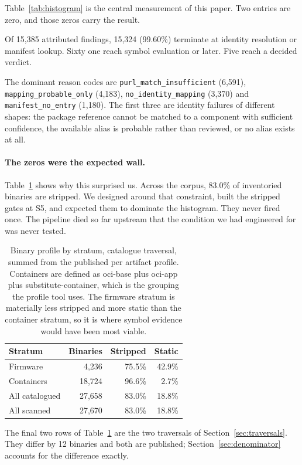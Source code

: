 Table~\ref{tab:histogram} is the central measurement of this paper. Two entries
are zero, and those zeros carry the result.

Of 15,385 attributed findings, 15,324 (99.60\%) terminate at identity resolution
or manifest lookup. Sixty one reach symbol evaluation or later. Five reach a
decided verdict.

The dominant reason codes are \texttt{purl\_\-match\_\-insufficient} (6,591),
\texttt{mapping\_probable\_only} (4,183), \texttt{no\_identity\_mapping} (3,370)
and \texttt{manifest\_no\_entry} (1,180). The first three are identity failures
of different shapes: the package reference cannot be matched to a component with
sufficient confidence, the available alias is probable rather than reviewed, or
no alias exists at all.

\paragraph{The zeros were the expected wall.} Table~\ref{tab:profile} shows why
this surprised us. Across the corpus, 83.0\% of inventoried binaries are
stripped. We designed around that constraint, built the stripped gates at S5, and
expected them to dominate the histogram. They never fired once. The pipeline died
so far upstream that the condition we had engineered for was never tested.

\begin{table}[t]
\caption{Binary profile by stratum, catalogue traversal, summed from the
published per artifact profile. Containers are defined as oci-base plus oci-app
plus substitute-container, which is the grouping the profile tool uses. The
firmware stratum is materially less stripped and more static than the container
stratum, so it is where symbol evidence would have been most viable.}
\label{tab:profile}
\centering
\begin{tabular}{@{}lrrr@{}}
\toprule
Stratum & Binaries & Stripped & Static \\
\midrule
Firmware & 4,236 & 75.5\% & 42.9\% \\
Containers & 18,724 & 96.6\% & 2.7\% \\
\midrule
All catalogued & 27,658 & 83.0\% & 18.8\% \\
All scanned & 27,670 & 83.0\% & 18.8\% \\
\bottomrule
\end{tabular}
\end{table}

The final two rows of Table~\ref{tab:profile} are the two traversals of
Section~\ref{sec:traversals}. They differ by 12 binaries and both are published;
Section~\ref{sec:denominator} accounts for the difference exactly.

